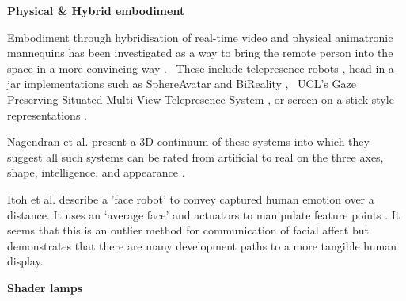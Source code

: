  \textbf{Physical \& Hybrid embodiment}
 
                    Embodiment through hybridisation of real-time video and physical animatronic mannequins has been investigated as a way to bring the remote person into the space in a more convincing way \cite{Lincoln2009, Lincoln2010, Raskar2001}. \ These include telepresence robots \cite{Lee2011, Sakamoto2007, Tsui2011}, head in a jar implementations such as SphereAvatar \cite{Oyekoya2012, Pan2014, Pan2012} and BiReality \cite{Jouppi2004}, \ UCL's Gaze Preserving Situated Multi-View Telepresence System \cite{Pan2014}, or screen on a stick style representations \cite{Kristoffersson2013}.\par  
                    Nagendran et al. present a 3D continuum of these systems into which they suggest all such systems can be rated from artificial to real on the three axes, shape, intelligence, and appearance \cite{Nagendran2012}.\par
                    Itoh et al. describe a 'face robot' to convey captured human emotion over a distance. It uses an `average face' and actuators to manipulate feature points \cite{Itoh2005}. It seems that this is an outlier method for communication of facial affect but demonstrates that there are many development paths to a more tangible human display.\par 
                    
\textbf{Shader lamps}

